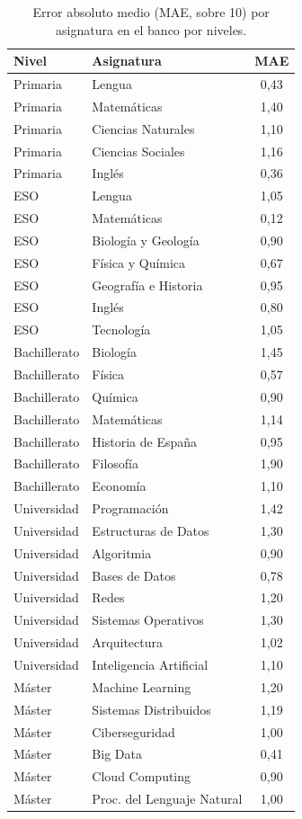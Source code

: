 \begin{table}[ht]
\centering
\caption{Error absoluto medio (MAE, sobre 10) por asignatura en el banco por niveles.}
\label{tab:porasig}
\footnotesize
\begin{tabular}{llc}
\toprule
Nivel & Asignatura & MAE \\
\midrule
Primaria & Lengua & 0{,}43 \\
Primaria & Matemáticas & 1{,}40 \\
Primaria & Ciencias Naturales & 1{,}10 \\
Primaria & Ciencias Sociales & 1{,}16 \\
Primaria & Inglés & 0{,}36 \\
ESO & Lengua & 1{,}05 \\
ESO & Matemáticas & 0{,}12 \\
ESO & Biología y Geología & 0{,}90 \\
ESO & Física y Química & 0{,}67 \\
ESO & Geografía e Historia & 0{,}95 \\
ESO & Inglés & 0{,}80 \\
ESO & Tecnología & 1{,}05 \\
Bachillerato & Biología & 1{,}45 \\
Bachillerato & Física & 0{,}57 \\
Bachillerato & Química & 0{,}90 \\
Bachillerato & Matemáticas & 1{,}14 \\
Bachillerato & Historia de España & 0{,}95 \\
Bachillerato & Filosofía & 1{,}90 \\
Bachillerato & Economía & 1{,}10 \\
Universidad & Programación & 1{,}42 \\
Universidad & Estructuras de Datos & 1{,}30 \\
Universidad & Algoritmia & 0{,}90 \\
Universidad & Bases de Datos & 0{,}78 \\
Universidad & Redes & 1{,}20 \\
Universidad & Sistemas Operativos & 1{,}30 \\
Universidad & Arquitectura & 1{,}02 \\
Universidad & Inteligencia Artificial & 1{,}10 \\
Máster & Machine Learning & 1{,}20 \\
Máster & Sistemas Distribuidos & 1{,}19 \\
Máster & Ciberseguridad & 1{,}00 \\
Máster & Big Data & 0{,}41 \\
Máster & Cloud Computing & 0{,}90 \\
Máster & Proc. del Lenguaje Natural & 1{,}00 \\
\bottomrule
\end{tabular}
\end{table}

